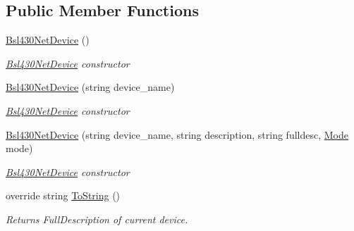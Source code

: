 \subsection*{Public Member Functions}
\begin{DoxyCompactItemize}
\item 
\mbox{\hyperlink{class_b_s_l430___n_e_t_1_1_bsl430_net_device_abcdcd0e40e493775e521b3eed60283e1}{Bsl430\+Net\+Device}} ()
\begin{DoxyCompactList}\small\item\em \mbox{\hyperlink{class_b_s_l430___n_e_t_1_1_bsl430_net_device}{Bsl430\+Net\+Device}} constructor \end{DoxyCompactList}\item 
\mbox{\hyperlink{class_b_s_l430___n_e_t_1_1_bsl430_net_device_a82e03ea0bfaac388e89ace84863c9486}{Bsl430\+Net\+Device}} (string device\+\_\+name)
\begin{DoxyCompactList}\small\item\em \mbox{\hyperlink{class_b_s_l430___n_e_t_1_1_bsl430_net_device}{Bsl430\+Net\+Device}} constructor \end{DoxyCompactList}\item 
\mbox{\hyperlink{class_b_s_l430___n_e_t_1_1_bsl430_net_device_a52328e6be154f29334f674026236d45a}{Bsl430\+Net\+Device}} (string device\+\_\+name, string description, string fulldesc, \mbox{\hyperlink{namespace_b_s_l430___n_e_t_aa1c6981cb6f279b5491d861ca555a1d7}{Mode}} mode)
\begin{DoxyCompactList}\small\item\em \mbox{\hyperlink{class_b_s_l430___n_e_t_1_1_bsl430_net_device}{Bsl430\+Net\+Device}} constructor \end{DoxyCompactList}\item 
override string \mbox{\hyperlink{class_b_s_l430___n_e_t_1_1_bsl430_net_device_a43945e4e1fab52852ee31dd826ca079c}{To\+String}} ()
\begin{DoxyCompactList}\small\item\em Returns Full\+Description of current device. \end{DoxyCompactList}\end{DoxyCompactItemize}
